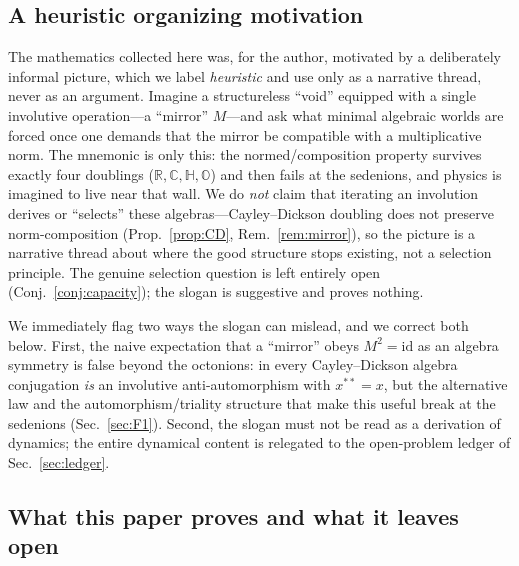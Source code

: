 \documentclass[aps,prresearch,onecolumn,amsmath,amssymb,nofootinbib]{revtex4-2}
\theoremstyle{plain}\newtheorem{theorem}{Theorem}[section]\newtheorem{proposition}[theorem]{Proposition}\newtheorem{lemma}[theorem]{Lemma}\newtheorem{corollary}[theorem]{Corollary}
\theoremstyle{definition}\newtheorem{definition}[theorem]{Definition}\newtheorem{conjecture}[theorem]{Conjecture}
\theoremstyle{remark}\newtheorem{remark}[theorem]{Remark}
\begin{document}
\subsection{A heuristic organizing motivation}

The mathematics collected here was, for the author, motivated by a deliberately informal picture, which we label \emph{heuristic} and use only as a narrative thread, never as an argument. Imagine a structureless ``void'' equipped with a single involutive operation---a ``mirror'' $M$---and ask what minimal algebraic worlds are forced once one demands that the mirror be compatible with a multiplicative norm. The mnemonic is only this: the normed/composition property survives exactly four doublings ($\mathbb{R},\mathbb{C},\mathbb{H},\mathbb{O}$) and then fails at the sedenions, and physics is imagined to live near that wall. We do \emph{not} claim that iterating an involution derives or ``selects'' these algebras---Cayley--Dickson doubling does not preserve norm-composition (Prop.~\ref{prop:CD}, Rem.~\ref{rem:mirror}), so the picture is a narrative thread about where the good structure stops existing, not a selection principle. The genuine selection question is left entirely open (Conj.~\ref{conj:capacity}); the slogan is suggestive and proves nothing.

We immediately flag two ways the slogan can mislead, and we correct both below. First, the naive expectation that a ``mirror'' obeys $M^2=\mathrm{id}$ as an algebra symmetry is false beyond the octonions: in every Cayley--Dickson algebra conjugation \emph{is} an involutive anti-automorphism with $x^{**}=x$, but the alternative law and the automorphism/triality structure that make this useful break at the sedenions (Sec.~\ref{sec:F1}). Second, the slogan must not be read as a derivation of dynamics; the entire dynamical content is relegated to the open-problem ledger of Sec.~\ref{sec:ledger}.

\subsection{What this paper proves and what it leaves open}
\end{document}
